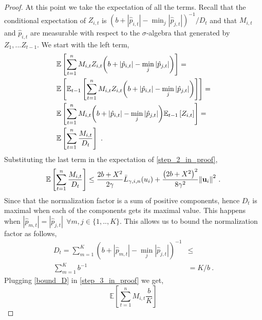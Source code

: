 \begin{proof}
At this point we take  the expectation of all the terms.  Recall that the conditional expectation of $Z_{i,t}$ is 
$(b+|\hat{p}_{i,t}|-\min_j| \hat{p}_{j,t}|)^{-1}/D_{t}$
and that $M_{i,t}$ and $\hat{p}_{i,t}$ are measurable with respect to the $\sigma$-algebra that generated by $Z_1,...Z_{t-1}$. 
We start with the left term,
\begin{align*}
\begin{split}
&\mathbb{E}\left[{\sum_{t=1}^{n}M_{i,t}Z_{i,t}{\left({{b
        +\left\vert{\hat{p}_{i,t}}\right\vert}-\min_{j}{\left\vert{ \hat{p}_{j,t}}\right\vert}}\right)}}\right]= \\
        &\mathbb{E}\left[{\mathbb{E}_{t-1}\left[{{\sum_{t=1}^{n}{M_{i,t}Z_{i,t}{\left({b +\left\vert{\hat{p}_{i,t}}\right\vert}-\min_{j}{\left\vert{\hat{p}_{j,t}}\right\vert}\right)}}}}\right]}\right]= \\
&\mathbb{E}\left[{{\sum_{t=1}^{n}M_{i,t}{\left({b +\left\vert{\hat{p}_{i,t}}\right\vert}-\min_{j}{\left\vert \hat{p}_{j,t} \right\vert}\right)}\mathbb{E}_{t-1}\left[{ Z_{i,t}}\right]}}\right]=\\
&\mathbb{E}\left[{\sum_{t=1}^{n}{\frac{M_{i,t}}{D_{t}}}}\right]~.
\end{split}
\end{align*}
Substituting the last term in the expectation of
\eqref{step_2_in_proof}, %
\begin{equation}
\mathbb{E}\left[ \sum_{t=1}^{n}{\frac{M_{i,t}}{D_{t}}} \right]
\le \frac{2b+X^2}{2\gamma}{\bar
  L}_{\gamma,i,n}(u_i)+\frac{\left({2b+X^2}\right)^2}{8{\gamma}^2}{\left\Vert
    \mathbf{u}_{i} \right\Vert}^2~.
\label{step_3_in_proof}
\end{equation} 
Since that the normalization factor is a sum of positive components,
hence $D_t$ is maximal when each of the components gets its maximal
value. This happens when $\left\vert \hat{p}_{m,t}
\right\vert=\left\vert \hat{p}_{j,t} \right\vert ~~  \forall
m,j \in\{1,..,K\}$. This allows us to bound the normalization factor as
follows,
\begin{equation}
\begin{split}
D_{t}=\sum_{m=1}^{K}{\left({b+\left\vert \hat{p}_{m,t}
      \right\vert-\min_{j}{\left\vert \hat{p}_{j,t}
        \right\vert}}\right)^{-1}}& \le \\ \sum_{m=1}^{K}{b^{-1}}&=K/b~.
\end{split}
\label{bound_D}
\end{equation}
Plugging \eqref{bound_D} in \eqref{step_3_in_proof} we get,
\begin{equation}\label{eq:bound_for_i}
\mathbb{E}\left[ \sum_{t=1}^{n}{M_{i,t}\frac{b}{K}} \right]

\end{equation}
\end{proof}
